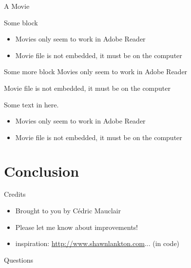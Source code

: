 \documentclass[xcolor=svgnames,handout]{beamer}
\begin{document}
\begin{frame}
  {A Movie}

  \begin{block}{Some block}
    \begin{itemize}
    \item Movies only seem to work in Adobe Reader
    \item Movie file is not embedded, it must be on the computer
    \end{itemize}
  \end{block}

  \begin{exampleblock}{Some more block}
    Movies only seem to work in Adobe Reader\par
    Movie file is not embedded, it must be on the computer
  \end{exampleblock}

  \begin{alertblock}{}
    Some text in here.
    \begin{itemize}
    \item Movies only seem to work in Adobe Reader
    \item Movie file is not embedded, it must be on the computer
    \end{itemize}
  \end{alertblock}
\end{frame}



\section
  {Conclusion}

\begin{frame}
  {Credits}

  \begin{itemize}
  \item Brought to you by Cédric Mauclair
  \item Please let me know about improvements!
  \item inspiration: \url{http://www.shawnlankton.com}... (in code)
  \end{itemize}
\end{frame}


\begin{frame}
  {Questions}

  \nocite{lorem,ipsum}
  
  

\end{frame}
\end{document}

